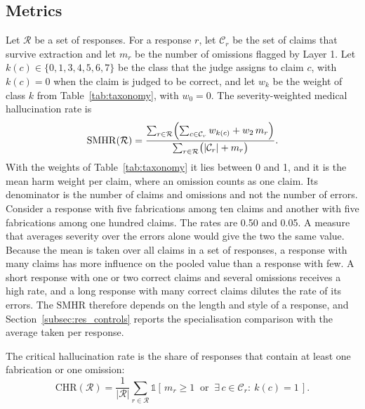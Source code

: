 \documentclass[11pt,a4paper]{article}
\newcommand{\SMHR}{\ensuremath{\mathrm{SMHR}}}
\newcommand{\CHR}{\ensuremath{\mathrm{CHR}}}
\begin{document}
\subsection{Metrics}\label{sec:metrics}
Let $\mathcal{R}$ be a set of responses. For a response $r$, let $\mathcal{C}_r$ be the set of claims that survive extraction and let $m_r$ be the number of omissions flagged by Layer 1. Let $k(c)\in\{0,1,3,4,5,6,7\}$ be the class that the judge assigns to claim $c$, with $k(c)=0$ when the claim is judged to be correct, and let $w_k$ be the weight of class $k$ from Table~\ref{tab:taxonomy}, with $w_0=0$. The severity-weighted medical hallucination rate is
\begin{equation}
  \SMHR(\mathcal{R}) = \frac{\sum_{r\in\mathcal{R}}\Bigl(\sum_{c\in\mathcal{C}_r} w_{k(c)} + w_2\, m_r\Bigr)}{\sum_{r\in\mathcal{R}}\bigl(|\mathcal{C}_r| + m_r\bigr)} .
\end{equation}
With the weights of Table~\ref{tab:taxonomy} it lies between 0 and 1, and it is the mean harm weight per claim, where an omission counts as one claim. Its denominator is the number of claims and omissions and not the number of errors. Consider a response with five fabrications among ten claims and another with five fabrications among one hundred claims. The rates are 0.50 and 0.05. A measure that averages severity over the errors alone would give the two the same value. Because the mean is taken over all claims in a set of responses, a response with many claims has more influence on the pooled value than a response with few. A short response with one or two correct claims and several omissions receives a high rate, and a long response with many correct claims dilutes the rate of its errors. The \SMHR{} therefore depends on the length and style of a response, and Section~\ref{subsec:res_controls} reports the specialisation comparison with the average taken per response.

The critical hallucination rate is the share of responses that contain at least one fabrication or one omission:
\begin{equation}
  \CHR(\mathcal{R}) = \frac{1}{|\mathcal{R}|}\sum_{r\in\mathcal{R}} \mathbb{1}\!\left[\, m_r\ge 1 \ \text{ or } \ \exists\, c\in\mathcal{C}_r:\ k(c)=1 \,\right].
\end{equation}
\end{document}
